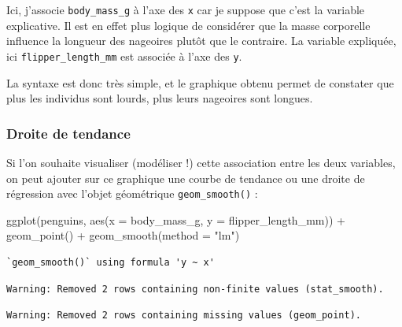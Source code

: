 \documentclass[
  letterpaper,
  DIV=11,
  numbers=noendperiod]{scrreprt}
\newenvironment{Shaded}{\begin{snugshade}}{\end{snugshade}}
\newcommand{\AttributeTok}[1]{\textcolor[rgb]{0.40,0.45,0.13}{#1}}
\newcommand{\FunctionTok}[1]{\textcolor[rgb]{0.28,0.35,0.67}{#1}}
\newcommand{\NormalTok}[1]{\textcolor[rgb]{0.00,0.23,0.31}{#1}}
\newcommand{\SpecialCharTok}[1]{\textcolor[rgb]{0.37,0.37,0.37}{#1}}
\newcommand{\StringTok}[1]{\textcolor[rgb]{0.13,0.47,0.30}{#1}}
\begin{document}
Ici, j'associe \texttt{body\_mass\_g} à l'axe des \texttt{x} car je
suppose que c'est la variable explicative. Il est en effet plus logique
de considérer que la masse corporelle influence la longueur des
nageoires plutôt que le contraire. La variable expliquée, ici
\texttt{flipper\_length\_mm} est associée à l'axe des \texttt{y}.

La syntaxe est donc très simple, et le graphique obtenu permet de
constater que plus les individus sont lourds, plus leurs nageoires sont
longues.

\hypertarget{droite-de-tendance}{%
\subsubsection{Droite de tendance}\label{droite-de-tendance}}

Si l'on souhaite visualiser (modéliser !) cette association entre les
deux variables, on peut ajouter sur ce graphique une courbe de tendance
ou une droite de régression avec l'objet géométrique
\texttt{geom\_smooth()} :

\begin{Shaded}
\begin{Highlighting}[]
\FunctionTok{ggplot}\NormalTok{(penguins, }\FunctionTok{aes}\NormalTok{(}\AttributeTok{x =}\NormalTok{ body\_mass\_g, }\AttributeTok{y =}\NormalTok{ flipper\_length\_mm)) }\SpecialCharTok{+}
  \FunctionTok{geom\_point}\NormalTok{() }\SpecialCharTok{+}
  \FunctionTok{geom\_smooth}\NormalTok{(}\AttributeTok{method =} \StringTok{"lm"}\NormalTok{)}
\end{Highlighting}
\end{Shaded}

\begin{verbatim}
`geom_smooth()` using formula 'y ~ x'
\end{verbatim}

\begin{verbatim}
Warning: Removed 2 rows containing non-finite values (stat_smooth).
\end{verbatim}

\begin{verbatim}
Warning: Removed 2 rows containing missing values (geom_point).
\end{verbatim}
\end{document}
